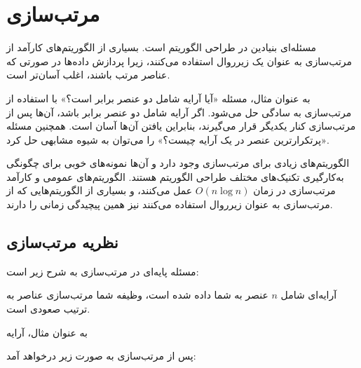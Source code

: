 \chapter{مرتب‌سازی}


مسئله‌ای بنیادین در طراحی الگوریتم است.
بسیاری از الگوریتم‌های کارآمد
از مرتب‌سازی به عنوان یک زیرروال استفاده می‌کنند،
زیرا پردازش داده‌ها در صورتی که عناصر مرتب باشند،
اغلب آسان‌تر است.

به عنوان مثال، مسئله «آیا آرایه شامل دو عنصر برابر است؟»
با استفاده از مرتب‌سازی به سادگی حل می‌شود.
اگر آرایه شامل دو عنصر برابر باشد،
آن‌ها پس از مرتب‌سازی کنار یکدیگر قرار می‌گیرند،
بنابراین یافتن آن‌ها آسان است.
همچنین مسئله «پرتکرارترین عنصر در یک آرایه چیست؟»
را می‌توان به شیوه مشابهی حل کرد.

الگوریتم‌های زیادی برای مرتب‌سازی وجود دارد و آن‌ها
نمونه‌های خوبی برای چگونگی به‌کارگیری تکنیک‌های مختلف
طراحی الگوریتم هستند.
الگوریتم‌های عمومی و کارآمد مرتب‌سازی
در زمان $O(n \log n)$ عمل می‌کنند،
و بسیاری از الگوریتم‌هایی که از مرتب‌سازی به عنوان زیرروال
استفاده می‌کنند نیز همین پیچیدگی زمانی را دارند.

\section{نظریه مرتب‌سازی}

مسئله پایه‌ای در مرتب‌سازی به شرح زیر است:
\begin{framed}
\noindent
آرایه‌ای شامل $n$ عنصر به شما داده شده است،
وظیفه شما مرتب‌سازی عناصر به ترتیب صعودی است.
\end{framed}
\noindent
به عنوان مثال، آرایه
\begin{center}
\end{center}
پس از مرتب‌سازی به صورت زیر درخواهد آمد:
\begin{center}
\end{center}

